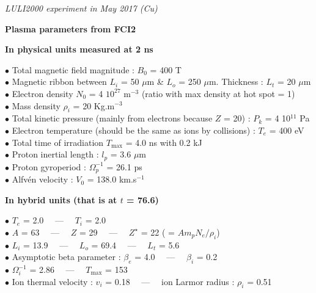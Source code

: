 \documentclass{report}
\begin{document}
{\it
LULI2000 experiment in May 2017 (Cu)}

\bigskip

\begin{center}
{\large
\bf
Plasma parameters from FCI2\\[0.2cm]
}
{\it }
\end{center}

\bigskip

{\bf In physical units measured at 2 ns}

\smallskip

$\bullet$ Total magnetic field magnitude : $B_0$ = 400 T \\
$\bullet$ Magnetic ribbon between $L_i$ = 50 $\mu$m \& $L_o$ = 250 $\mu$m. Thickness : $L_t$ = 20 $\mu$m \\
$\bullet$ Electron density $N_0$ = 4 $10^{27}$ m$^{-3}$ (ratio with max density at hot spot = 1) \\
$\bullet$ Mass density $\rho_i$ = 20 Kg.m$^{-3}$ \\
$\bullet$ Total kinetic pressure (mainly from electrons because $Z$ = 20) : $P_k$ = 4 10$^{11}$ Pa \\
$\bullet$ Electron temperature (should be the same as ions by collisions) : $T_e$ = 400 eV \\
$\bullet$ Total time of irradiation $T_{\max}$ = 4.0 ns with 0.2 kJ \\
$\bullet$ Proton inertial length : $l_p$ = 3.6 $\mu$m \\
$\bullet$ Proton gyroperiod : $\Omega_p^{-1}$ = 26.1 ps \\
$\bullet$ Alfvén velocity : $V_0$ = 138.0 km.s$^{-1}$ \\

\medskip

{\bf In hybrid units (that is at $t$ = 76.6)}

\smallskip

$\bullet$ $T_e$ = 2.0 \ \ --- \ \ $T_i$ = 2.0 \\
$\bullet$ $A$ = 63 \ \ --- \ \ $Z$ = 29 \ \ --- \ \ $Z^{\star}$ = 22 ( = $A m_p N_e / \rho_i$) \\
$\bullet$ $L_i$ = 13.9 \ \ --- \ \ $L_o$ = 69.4 \ \ --- \ \ $L_t$ = 5.6 \\
$\bullet$ Asymptotic beta parameter : $\beta_e$ = 4.0 \ \ --- \ \ $\beta_i$ = 0.2 \\
$\bullet$ $\Omega_i^{-1}$ = 2.86 \ \ --- \ \ $T_{\max}$ = 153 \\
$\bullet$ Ion thermal velocity : $v_i$ = 0.18 \ \ --- \ \ ion Larmor radius : $\rho_i$ = 0.51 \\
\end{document}
